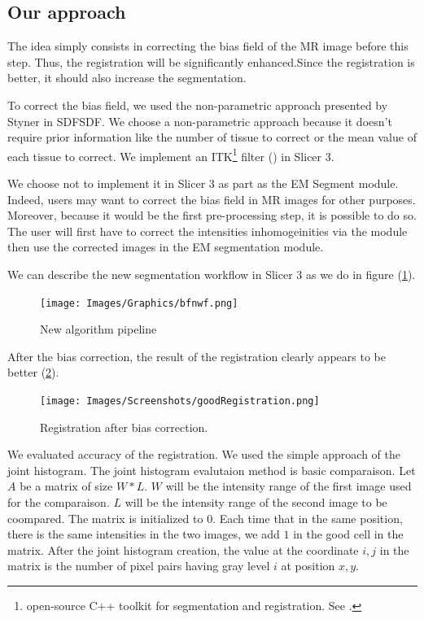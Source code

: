 \subsection{Our approach}

The idea simply consists in correcting the bias field of the MR image before this step. Thus, the registration will be significantly enhanced.Since the registration is better, it should also increase the segmentation.
\par
To correct the bias field, we used the non-parametric approach presented by Styner in SDFSDF. We choose a non-parametric approach because it doesn't require prior information like the number of tissue to correct or the mean value of each tissue to correct. We implement an ITK\footnote{open-source C++ toolkit for segmentation and registration. See \cite{13}.} filter (\cite{14}) in Slicer 3. 
\par
We choose not to implement it in Slicer 3 as part as the EM Segment module. Indeed, users may want to correct the bias field in MR images for other purposes. Moreover, because it would be the first pre-processing step, it is possible to do so. The user will first have to correct the intensities inhomogeinities via the module then use the corrected images in the EM segmentation module.
\par
We can describe the new segmentation workflow in Slicer 3 as we do in figure (\ref{fig:wfwbc}).



\begin{figure}[ht]\centering
  \texttt{[image: Images/Graphics/bfnwf.png]}
  \caption{New algorithm pipeline}\label{fig:wfwbc}
  \end{figure}
  
  
\par
After the bias correction, the result of the registration clearly appears to be better  (\ref{fig:goodRegistration}). 

\begin{figure}\centering
  \texttt{[image: Images/Screenshots/goodRegistration.png]}
  \caption{Registration after bias correction.}\label{fig:goodRegistration}
\end{figure}
\par
We evaluated accuracy of the registration. We used the simple approach of the joint histogram.
The joint histogram evalutaion method is basic comparaison. Let $A$ be a matrix of size $W*L$. $W$ will be the intensity range of the first image used for the comparaison. $L$ will be the intensity range of the second image to be coompared. The matrix is initialized to $0$. Each time that in the same position, there is the same intensities in the two images, we add $1$ in the good cell in the matrix.
After the joint histogram creation, the value at the coordinate ${i,j}$ in the matrix is the number of pixel pairs having gray level $i$ at position ${x,y}$.


